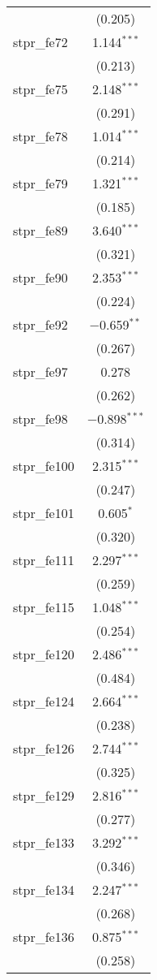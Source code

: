 \begin{table}[!htbp]
\begin{tabular}{@{\extracolsep{5pt}}lc}
  & (0.205) \\ 
  stpr\_fe72 & 1.144$^{***}$ \\ 
  & (0.213) \\ 
  stpr\_fe75 & 2.148$^{***}$ \\ 
  & (0.291) \\ 
  stpr\_fe78 & 1.014$^{***}$ \\ 
  & (0.214) \\ 
  stpr\_fe79 & 1.321$^{***}$ \\ 
  & (0.185) \\ 
  stpr\_fe89 & 3.640$^{***}$ \\ 
  & (0.321) \\ 
  stpr\_fe90 & 2.353$^{***}$ \\ 
  & (0.224) \\ 
  stpr\_fe92 & $-$0.659$^{**}$ \\ 
  & (0.267) \\ 
  stpr\_fe97 & 0.278 \\ 
  & (0.262) \\ 
  stpr\_fe98 & $-$0.898$^{***}$ \\ 
  & (0.314) \\ 
  stpr\_fe100 & 2.315$^{***}$ \\ 
  & (0.247) \\ 
  stpr\_fe101 & 0.605$^{*}$ \\ 
  & (0.320) \\ 
  stpr\_fe111 & 2.297$^{***}$ \\ 
  & (0.259) \\ 
  stpr\_fe115 & 1.048$^{***}$ \\ 
  & (0.254) \\ 
  stpr\_fe120 & 2.486$^{***}$ \\ 
  & (0.484) \\ 
  stpr\_fe124 & 2.664$^{***}$ \\ 
  & (0.238) \\ 
  stpr\_fe126 & 2.744$^{***}$ \\ 
  & (0.325) \\ 
  stpr\_fe129 & 2.816$^{***}$ \\ 
  & (0.277) \\ 
  stpr\_fe133 & 3.292$^{***}$ \\ 
  & (0.346) \\ 
  stpr\_fe134 & 2.247$^{***}$ \\ 
  & (0.268) \\ 
  stpr\_fe136 & 0.875$^{***}$ \\ 
  & (0.258) \\ 

\end{tabular}
\end{table}
